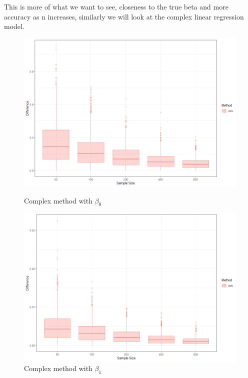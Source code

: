 \documentclass[honours,12pt]{unswthesis}
\numberwithin{equation}{section}
\begin{document}
\noindent This is more of what we want to see, closeness to the true beta and more accuracy as n increases, similarly we will look at the complex linear regression model.

\begin{figure}[hpb]
    \centering
    \begin{minipage}{0.5\textwidth}
        \centering
        \includegraphics[width=\textwidth]{graphics/b0_clm}
        \caption{Complex method with $\beta_{0}$}
    \end{minipage}\hfill
    \begin{minipage}{0.5\textwidth}
        \centering
        \includegraphics[width=\textwidth]{graphics/b1_clm} 
        \caption{Complex method with $\beta_{1}$}
    \end{minipage}
\end{figure}
\end{document}
